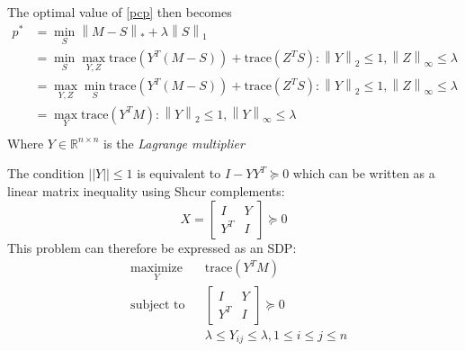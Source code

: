 \documentclass[a4paper]{article}
\newcommand{\tr}[1]{\text{trace}(#1)}
\newcommand\norm[2]{\left\lVert#1\right\rVert _{#2}}
\begin{document}
The optimal value of \ref{pcp} then becomes
\begin{equation}
\begin{aligned}
p^* & = \min_S \norm{M - S}{*} + \lambda \norm{S}{1} \\
    & = \min_S \max_{Y, Z} \tr{Y^T(M - S)} + \tr{Z^T S} : \norm{Y}{2}\leq 1, \norm{Z}{\infty} \leq \lambda \\
    & = \max_{Y, Z} \min_S \tr{Y^T(M - S)} + \tr{Z^T S} : \norm{Y}{2}\leq 1, \norm{Z}{\infty} \leq \lambda \\ 
    & = \max_Y \tr{Y^TM} : \norm{Y}{2}\leq 1, \norm{Y}{\infty} \leq \lambda \\ 
\end{aligned}
\end{equation}
Where $Y\in \mathds{R}^{n\times n}$ is the \textit{Lagrange multiplier}

The condition $||Y||\leq 1$ is equivalent to $I  - YY^T \succeq 0$ which can be written as a linear matrix inequality using Shcur complements:
$$ X = \begin{bmatrix} I & Y \\ Y^T & I \end{bmatrix} \succeq 0$$
This problem can therefore be expressed as an SDP:
\begin{equation}
\label{sdp}
\begin{aligned}
& \underset{Y}{\text{maximize}}
& & \tr{Y^T M}\\
& \text{subject to}
& & \begin{bmatrix} I & Y \\ Y^T & I \end{bmatrix} \succeq 0 \\
& & & \lambda \leq Y_{ij} \leq \lambda, 1 \leq i \leq j \leq n
\end{aligned}
\end{equation}
\end{document}
